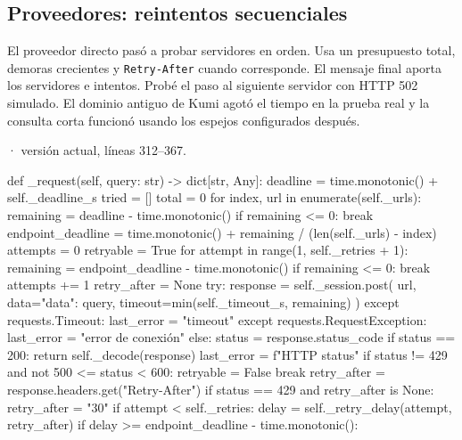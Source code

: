 \documentclass[11pt,a4paper]{article}
\begin{document}
\subsection{Proveedores: reintentos secuenciales}
El proveedor directo pasó a probar servidores en orden. Usa un presupuesto total, demoras crecientes y \texttt{Retry-After} cuando corresponde. El mensaje final aporta los servidores e intentos. Probé el paso al siguiente servidor con HTTP 502 simulado. El dominio antiguo de Kumi agotó el tiempo en la prueba real y la consulta corta funcionó usando los espejos configurados después.

\smallskip
{\footnotesize\texttt{} · versión actual, líneas 312--367.}\par
\begin{Codigo}[firstnumber=312]
    def _request(self, query: str) -> dict[str, Any]:
        deadline = time.monotonic() + self._deadline_s
        tried = []
        total = 0
        for index, url in enumerate(self._urls):
            remaining = deadline - time.monotonic()
            if remaining <= 0:
                break
            endpoint_deadline = time.monotonic() + remaining / (len(self._urls) - index)
            attempts = 0
            retryable = True
            for attempt in range(1, self._retries + 1):
                remaining = endpoint_deadline - time.monotonic()
                if remaining <= 0:
                    break
                attempts += 1
                retry_after = None
                try:
                    response = self._session.post(
                        url, data={"data": query}, timeout=min(self._timeout_s, remaining)
                    )
                except requests.Timeout:
                    last_error = "timeout"
                except requests.RequestException:
                    last_error = "error de conexión"
                else:
                    status = response.status_code
                    if status == 200:
                        return self._decode(response)
                    last_error = f"HTTP {status}"
                    if status != 429 and not 500 <= status < 600:
                        retryable = False
                        break
                    retry_after = response.headers.get("Retry-After")
                    if status == 429 and retry_after is None:
                        retry_after = "30"
                if attempt < self._retries:
                    delay = self._retry_delay(attempt, retry_after)
                    if delay >= endpoint_deadline - time.monotonic():

\end{Codigo}
\end{document}

